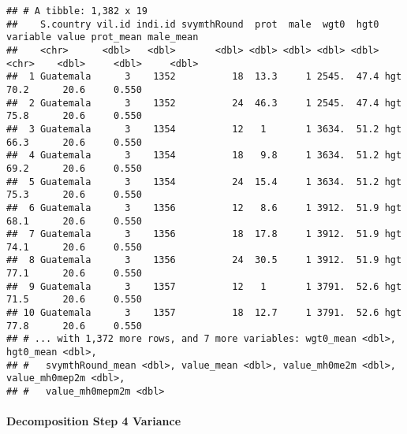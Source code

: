 \documentclass[
]{book}
\newenvironment{Shaded}{\begin{snugshade}}{\end{snugshade}}
\newcommand{\DataTypeTok}[1]{\textcolor[rgb]{0.13,0.29,0.53}{#1}}
\newcommand{\DecValTok}[1]{\textcolor[rgb]{0.00,0.00,0.81}{#1}}
\newcommand{\KeywordTok}[1]{\textcolor[rgb]{0.13,0.29,0.53}{\textbf{#1}}}
\newcommand{\NormalTok}[1]{#1}
\newcommand{\OperatorTok}[1]{\textcolor[rgb]{0.81,0.36,0.00}{\textbf{#1}}}
\newcommand{\StringTok}[1]{\textcolor[rgb]{0.31,0.60,0.02}{#1}}
\begin{document}
\begin{verbatim}
## # A tibble: 1,382 x 19
##    S.country vil.id indi.id svymthRound  prot  male  wgt0  hgt0 variable value prot_mean male_mean
##    <chr>      <dbl>   <dbl>       <dbl> <dbl> <dbl> <dbl> <dbl> <chr>    <dbl>     <dbl>     <dbl>
##  1 Guatemala      3    1352          18  13.3     1 2545.  47.4 hgt       70.2      20.6     0.550
##  2 Guatemala      3    1352          24  46.3     1 2545.  47.4 hgt       75.8      20.6     0.550
##  3 Guatemala      3    1354          12   1       1 3634.  51.2 hgt       66.3      20.6     0.550
##  4 Guatemala      3    1354          18   9.8     1 3634.  51.2 hgt       69.2      20.6     0.550
##  5 Guatemala      3    1354          24  15.4     1 3634.  51.2 hgt       75.3      20.6     0.550
##  6 Guatemala      3    1356          12   8.6     1 3912.  51.9 hgt       68.1      20.6     0.550
##  7 Guatemala      3    1356          18  17.8     1 3912.  51.9 hgt       74.1      20.6     0.550
##  8 Guatemala      3    1356          24  30.5     1 3912.  51.9 hgt       77.1      20.6     0.550
##  9 Guatemala      3    1357          12   1       1 3791.  52.6 hgt       71.5      20.6     0.550
## 10 Guatemala      3    1357          18  12.7     1 3791.  52.6 hgt       77.8      20.6     0.550
## # ... with 1,372 more rows, and 7 more variables: wgt0_mean <dbl>, hgt0_mean <dbl>,
## #   svymthRound_mean <dbl>, value_mean <dbl>, value_mh0me2m <dbl>, value_mh0mep2m <dbl>,
## #   value_mh0mepm2m <dbl>
\end{verbatim}

\hypertarget{decomposition-step-4-variance}{%
\paragraph{Decomposition Step 4 Variance}\label{decomposition-step-4-variance}}

\begin{Shaded}
\end{Shaded}
\end{document}
